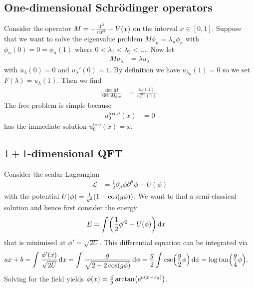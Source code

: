 \documentclass[english, parskip=full]{scrartcl}
\begin{document}
\subsection{One-dimensional Schrödinger operators}
Consider the operator $M=-\frac{\text{d}^2}{\text{d} x^2} + V(x)$ on the interval $x\in[0,1]$.
Suppose that we want to solve the eigenvalue problem $M\phi_n = \lambda_n\phi_n$ with $\phi_n(0)=0=\phi_n(1)$ where $0<\lambda_1<\lambda_2<\dots$.
Now let
\begin{align}
Mu_\lambda &= \lambda u_\lambda
\end{align}
with $u_\lambda(0) = 0$ and $u_\lambda'(0) = 1$.
By definition we have $u_{\lambda_n}(1) = 0$ so we set $F(\lambda) = u_\lambda(1)$.
Then we find
\begin{align}
\frac{\det M}{\det M_\text{free}} &= \frac{u_0(1)}{u_0^\text{free}(1)}.
\end{align}
The free problem is simple because
\begin{align}
{u_0^\text{free}}''(x) &= 0
\end{align}
has the immediate solution $u_0^\text{free}(x) = x$.
\subsection{$1+1$-dimensional QFT}
Consider the scalar Lagrangian
\begin{align}
\mathcal{L} &= \frac{1}{2} \partial_\mu\phi\partial^\mu\phi - U(\phi)
\end{align}
with the potential $U(\phi) =\frac{1}{g^2} \kla*{1 - \cos(g\phi)}$.
We want to find a semi-classical solution and hence first consider the energy
\begin{align}
E &= \intx{ }{ }{\kla*{\frac{1}{2}\phi'^2 + U(\phi)}}{x}
\end{align}
that is minimised at $\phi' = \sqrt{2U}$.
This differential equation can be integrated via
\begin{align}
ax+b &= \intx{ }{ }{\frac{\phi'(x)}{\sqrt{2U}}}{x} = \intx{ }{ }{\frac{g}{\sqrt{2 - 2\cos(g\phi)}}}{\phi} = \frac{g}{2} \intx{ }{ }{\csc\kla*{\frac{g}{2}\phi}}{\phi} = \log\tan \kla*{\frac{g}{4}\phi}.
\end{align}
Solving for the field yields $\phi(x) = \frac{4}{g} \arctan\kla*{\powe{a(x-x_0)}}$.


\end{document}
